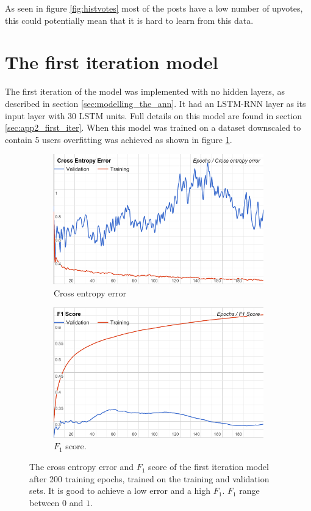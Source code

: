 As seen in figure \ref{fig:histvotes} most of the posts have a low number of upvotes, this could potentially mean that it is hard to learn from this data.

\section{The first iteration model}
The first iteration of the model was implemented with no hidden layers, as described in section \ref{sec:modelling_the_ann}. It had an LSTM-RNN layer as its input layer with 30 LSTM units. Full details on this model are found in section \ref{sec:app2_first_iter}. When this model was trained on a dataset downscaled to contain 5 users overfitting was achieved as shown in figure \ref{fig:first_iter_overfitting}.
\begin{figure}[h!]
\begin{subfigure}{0.5\textwidth}
\includegraphics[width=1 \linewidth]{figure/results/first_iter_cross}
\caption{Cross entropy error}
\label{fig:first_iter_overfitting}
\end{subfigure}
\begin{subfigure}{0.5\textwidth}
\includegraphics[width=1\linewidth]{figure/results/first_iter_f1}
\caption{$F_1$ score.}
\label{fig:first_iter_f1}
\end{subfigure}
 
\caption{The cross entropy error and $F_1$ score of the first iteration model after 200 training epochs, trained on the training and validation sets. It is good to achieve a low error and a high $F_1$. $F_1$ range between $0$ and $1$.}
\label{fig:image2}
\end{figure}
